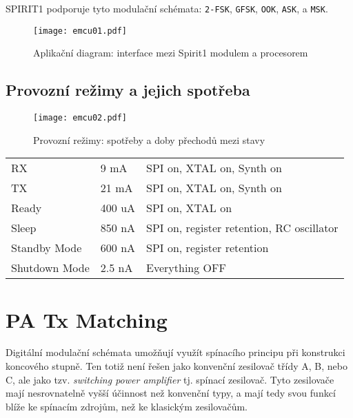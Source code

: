     SPIRIT1 podporuje tyto modulační schémata: \texttt{2-FSK}, \texttt{GFSK}, \texttt{OOK}, 
    \texttt{ASK}, a \texttt{MSK}. 

    \begin{figure}[ht!]  %
      \centering
      \texttt{[image: emcu01.pdf]}
      \caption{Aplikační diagram: interface mezi Spirit1 modulem a procesorem}
      \label{EXP001:fig_spirit22}
    \end{figure}   

    \subsection{Provozní režimy a jejich spotřeba}
      \begin{figure}[ht!]  %
        \centering
        \texttt{[image: emcu02.pdf]}
        \caption{Provozní režimy: spotřeby a doby přechodů mezi stavy}
        \label{EXP001:fig_spirit23}
      \end{figure}    

      \begin{table}[h]
        \begin{tabular}{lll}
          RX            & 9 mA   & SPI on, XTAL on, Synth on                 \\
          TX            & 21 mA  & SPI on, XTAL on, Synth on                 \\
          Ready         & 400 uA & SPI on, XTAL on                           \\
          Sleep         & 850 nA & SPI on, register retention, RC oscillator \\
          Standby Mode  & 600 nA & SPI on, register retention                \\
          Shutdown Mode & 2.5 nA & Everything OFF                           
          \end{tabular}
      \end{table}


  \section{PA Tx Matching}
    Digitální modulační schémata umožňují využít spínacího principu při konstrukci koncového 
    stupně. Ten totiž není řešen jako konvenční zesilovač třídy A, B, nebo C, ale jako tzv.  
    \emph{switching power amplifier} tj. spínací zesilovač. Tyto zesilovače mají nesrovnatelně 
    vyšší účinnost než konvenční typy, a mají tedy svou funkcí blíže ke spínacím zdrojům, než ke 
    klasickým zesilovačům.   
    
